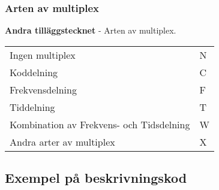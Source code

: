 \subsubsection{Arten av multiplex}
\textbf{Andra tilläggstecknet} - Arten av multiplex.\\
\begin{tabular}{ll}
	Ingen multiplex & N\\
	Koddelning & C\\
	Frekvensdelning & F\\
	Tiddelning & T\\
	Kombination av Frekvens- och Tidsdelning & W\\
	Andra arter av multiplex & X\\
\end{tabular}


\subsection{Exempel på beskrivningskod}
